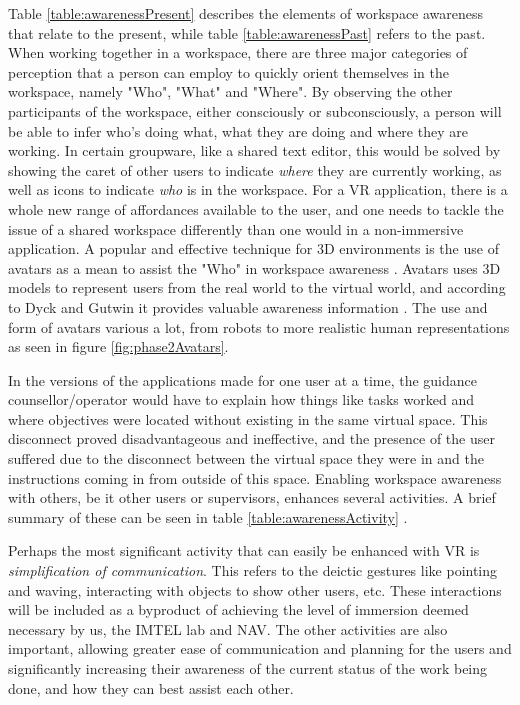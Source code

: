Table \ref{table:awarenessPresent} describes the elements of workspace awareness that relate to the present, while table \ref{table:awarenessPast} refers to the past. When working together in a workspace, there are three major categories of perception that a person can employ to quickly orient themselves in the workspace, namely "Who", "What" and "Where". By observing the other participants of the workspace, either consciously or subconsciously, a person will be able to infer who's doing what, what they are doing and where they are working. In certain groupware, like a shared text editor, this would be solved by showing the caret of other users to indicate \textit{where} they are currently working, as well as icons to indicate \textit{who} is in the workspace. For a VR application, there is a whole new range of affordances available to the user, and one needs to tackle the issue of a shared workspace differently than one would in a non-immersive application.
A popular and effective technique for 3D environments is the use of avatars as a mean to assist the "Who" in workspace awareness \cite{benford1995user}. Avatars uses 3D models to represent users from the real world to the virtual world, and according to Dyck and Gutwin it provides valuable awareness information \cite{dyck2002groupspace}. The use and form of avatars various a lot, from robots to more realistic human representations as seen in figure \ref{fig:phase2Avatars}. 


In the versions of the applications made for one user at a time, the guidance counsellor/operator would have to explain how things like tasks worked and where objectives were located without existing in the same virtual space. This disconnect proved disadvantageous and ineffective, and the presence of the user suffered due to the disconnect between the virtual space they were in and the instructions coming in from outside of this space. Enabling workspace awareness with others, be it other users or supervisors, enhances several activities. A brief summary of these can be seen in table \ref{table:awarenessActivity} \cite{gutwin2002descriptive}. 

Perhaps the most significant activity that can easily be enhanced with VR is \textit{simplification of communication}. This refers to the deictic gestures like pointing and waving, interacting with objects to show other users, etc. These interactions will be included as a byproduct of achieving the level of immersion deemed necessary by us, the IMTEL lab and NAV. The other activities are also important, allowing greater ease of communication and planning for the users and significantly increasing their awareness of the current status of the work being done, and how they can best assist each other.

